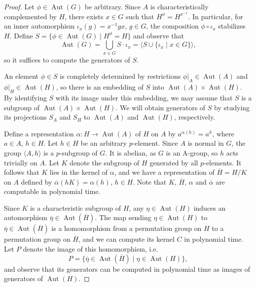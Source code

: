 \documentclass[10pt,a4paper]{amsart}
\DeclareMathOperator{\Aut}{Aut}
\begin{document}
\begin{proof}
	Let \( \phi \in \Aut(G) \) be arbitrary. Since \( A \) is characteristically complemented by \( H \), there exists
	\( x \in G \) such that \( H^\phi = H^{x^{-1}} \). In particular, for an inner automorphism \( \iota_x(g) = x^{-1}gx \), \( g \in G \),
	the composition \( \phi \circ \iota_x \) stabilizes \( H \). Define \( S = \{ \phi \in \Aut(G) \mid H^\phi = H \} \)
	and observe that
	\[ \Aut(G) = \bigcup_{x \in G} S \cdot \iota_x = \langle S \cup \{ \iota_x \mid x \in G \} \rangle, \]
	so it suffices to compute the generators of \( S \).

	An element \( \phi \in S \) is completely determined by restrictions \( \phi|_A \in \Aut(A) \)
	and \( \phi|_H \in \Aut(H) \), so there is an embedding of \( S \) into \( \Aut(A) \times \Aut(H) \).
	By identifying \( S \) with its image under this embedding, we may assume that \( S \) is a subgroup of \( \Aut(A) \times \Aut(H) \).
	We will obtain generators of \( S \) by studying its projections \( S_A \) and \( S_H \) to \( \Aut(A) \) and \( \Aut(H) \), respectively.

	Define a representation \( \alpha : H \to \Aut(A) \) of \( H \) on \( A \) by
	\( a^{\alpha(h)} = a^h \), where \( a \in A \), \( h \in H \).
	Let \( h \in H \) be an arbitrary \( p \)-element. Since \( A \) is normal in \( G \),
	the group \( \langle A, h \rangle \) is a \( p \)-subgroup of \( G \). It is abelian, as \( G \) is an A-group,
	so \( h \) acts trivially on \( A \). Let \( K \) denote the subgroup of \( H \) generated by all \( p \)-elements.
	It follows that \( K \) lies in the kernel of \( \alpha \), and we have a representation of \( \overline{H} = H/K \)
	on \( A \) defined by \( \overline{\alpha}(hK) = \alpha(h) \), \( h \in H \).
	Note that \( K \), \( \overline{H} \), \( \alpha \) and \( \overline{\alpha} \) are computable in polynomial time.

	Since \( K \) is a characteristic subgroup of \( H \), any \( \eta \in \Aut(H) \) induces an automorphism
	\( \overline{\eta} \in \Aut(\overline{H}) \). The map sending \( \eta \in \Aut(H) \) to \( \overline{\eta} \in \Aut(\overline{H}) \)
	is a homomorphism from a permutation group on \( H \) to a permutation group on \( \overline{H} \), and
	we can compute its kernel \( C \) in polynomial time. Let \( P \) denote the image of this homomorphism, i.e.
	\[ P = \{ \overline{\eta} \in \Aut(\overline{H}) \mid \eta \in \Aut(H) \}, \]
	and observe that its generators can be computed in polynomial time as images of generators of \( \Aut(H) \).


\end{proof}
\end{document}
